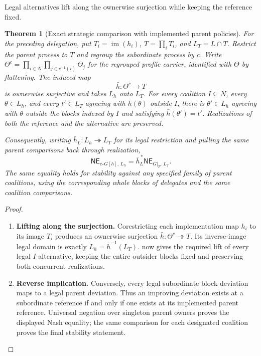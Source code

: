 \documentclass[11pt,a4paper]{article}
\numberwithin{equation}{section}
\newtheorem{theorem}{Theorem}[section]
\theoremstyle{definition}
\theoremstyle{remark}
\theoremstyle{plain}
\begin{document}
\noindent Legal alternatives lift along the ownerwise surjection while keeping the reference fixed.
\begin{center}
\end{center}

\begin{theorem}[Exact strategic comparison with implemented parent policies]
\label{thm:egt-delegation-image}
For the preceding delegation, put $T_i=\operatorname{im}(h_i)$,
$T=\prod_iT_i$, and $L_T=L\cap T$. Restrict the parent process to $T$
and regroup the subordinate process by $c$. Write
$\Theta^c=\prod_{i\in N}\prod_{j\in c^{-1}(i)}\Theta_j$
for the regrouped profile carrier, identified with $\Theta$
by flattening. The induced map
\[
 \bar h:\Theta^c\longrightarrow T
\]
is ownerwise surjective and takes $L_h$ onto $L_T$.
For every coalition $I\subseteq N$, every $\theta\in L_h$, and every
$t'\in L_T$ agreeing with $\bar h(\theta)$ outside $I$, there is
$\theta'\in L_h$ agreeing with $\theta$ outside the blocks indexed by $I$
and satisfying $\bar h(\theta')=t'$. Realizations of both the reference
and the alternative are preserved.

Consequently, writing $\bar h_L:L_h\twoheadrightarrow L_T$
for its legal restriction and pulling the same parent comparisons
back through realization,
\[
 \mathsf{NE}_{c_*G[h],\,L_h}
 =\bar h_L^{\,*}\mathsf{NE}_{G|_T,\,L_T}.
\]
The same equality holds for stability against any specified family of
parent coalitions, using the corresponding whole blocks of delegates and
the same coalition comparisons.
\end{theorem}
\begin{proof}
\leavevmode
\begin{enumerate}[label=\textup{(\arabic*)},leftmargin=*,itemsep=4pt,topsep=3pt]
  \item \textbf{Lifting along the surjection.} Corestricting each implementation map $h_i$ to its image $T_i$
produces an ownerwise surjection $\bar h:\Theta^c\twoheadrightarrow T$. Its inverse-image legal domain is exactly $L_h=\bar h^{-1}(L_T)$.  now gives the required lift of every
legal $I$-alternative, keeping the entire outsider blocks fixed and
preserving both concurrent realizations.
  \item \textbf{Reverse implication.} Conversely, every legal
subordinate block deviation maps to a legal parent deviation. Thus an improving deviation exists at a subordinate reference if and
only if one exists at its implemented parent reference. Universal
negation over singleton parent owners proves the displayed Nash equality;
the same comparison for each designated coalition proves the final
stability statement.
\end{enumerate}
\end{proof}
\end{document}
